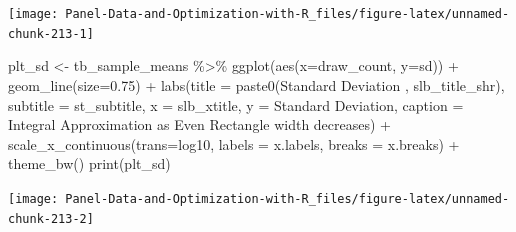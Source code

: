 \documentclass[
]{book}
\newenvironment{Shaded}{\begin{snugshade}}{\end{snugshade}}
\newcommand{\AttributeTok}[1]{\textcolor[rgb]{0.77,0.63,0.00}{#1}}
\newcommand{\FloatTok}[1]{\textcolor[rgb]{0.00,0.00,0.81}{#1}}
\newcommand{\FunctionTok}[1]{\textcolor[rgb]{0.00,0.00,0.00}{#1}}
\newcommand{\NormalTok}[1]{#1}
\newcommand{\OtherTok}[1]{\textcolor[rgb]{0.56,0.35,0.01}{#1}}
\newcommand{\SpecialCharTok}[1]{\textcolor[rgb]{0.00,0.00,0.00}{#1}}
\newcommand{\StringTok}[1]{\textcolor[rgb]{0.31,0.60,0.02}{#1}}
\begin{document}
\begin{center}\texttt{[image: Panel-Data-and-Optimization-with-R\_files/figure-latex/unnamed-chunk-213-1]} \end{center}

\begin{Shaded}
\begin{Highlighting}[]
\NormalTok{plt\_sd }\OtherTok{\textless{}{-}}\NormalTok{ tb\_sample\_means }\SpecialCharTok{\%\textgreater{}\%}
  \FunctionTok{ggplot}\NormalTok{(}\FunctionTok{aes}\NormalTok{(}\AttributeTok{x=}\NormalTok{draw\_count, }\AttributeTok{y=}\NormalTok{sd)) }\SpecialCharTok{+}
  \FunctionTok{geom\_line}\NormalTok{(}\AttributeTok{size=}\FloatTok{0.75}\NormalTok{) }\SpecialCharTok{+}
  \FunctionTok{labs}\NormalTok{(}\AttributeTok{title =} \FunctionTok{paste0}\NormalTok{(}\StringTok{\textquotesingle{}Standard Deviation \textquotesingle{}}\NormalTok{, slb\_title\_shr),}
       \AttributeTok{subtitle =}\NormalTok{ st\_subtitle,}
       \AttributeTok{x =}\NormalTok{ slb\_xtitle,}
       \AttributeTok{y =} \StringTok{\textquotesingle{}Standard Deviation\textquotesingle{}}\NormalTok{,}
       \AttributeTok{caption =} \StringTok{\textquotesingle{}Integral Approximation as Even Rectangle width decreases\textquotesingle{}}\NormalTok{) }\SpecialCharTok{+}
  \FunctionTok{scale\_x\_continuous}\NormalTok{(}\AttributeTok{trans=}\StringTok{\textquotesingle{}log10\textquotesingle{}}\NormalTok{, }\AttributeTok{labels =}\NormalTok{ x.labels, }\AttributeTok{breaks =}\NormalTok{ x.breaks) }\SpecialCharTok{+}
  \FunctionTok{theme\_bw}\NormalTok{()}
\FunctionTok{print}\NormalTok{(plt\_sd)}
\end{Highlighting}
\end{Shaded}

\begin{center}\texttt{[image: Panel-Data-and-Optimization-with-R\_files/figure-latex/unnamed-chunk-213-2]} \end{center}
\end{document}
